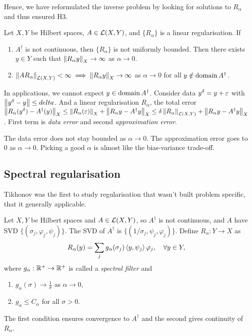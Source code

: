 \documentclass[12pt]{article}
\begin{document}
Hence, we have reformulated the inverse problem by looking for solutions to $R_\alpha$ and thus ensured H3.

\begin{theorem}
    Let $X,Y$ be Hilbert spaces, $A\in \mathcal{L}(X,Y)$, and $\{R_\alpha\}$ is a linear regularisation. If 
    \begin{enumerate}[label=(\alph*)]
        \item $A^\dagger $ is not continuous, then $\{ R_{\alpha} \}$ is not uniformly bounded. Then there exists $y\in Y$ such that $\left\lVert R_{\alpha} y\right\rVert_X \to \infty$ as $\alpha \to 0$. 
        \item $\left\lVert AR_\alpha\right\rVert_{\mathcal{L}(X,Y)} < \infty \implies \left\lVert R_\alpha y\right\rVert_X \to \infty$ as $\alpha \to 0$ for all $y \notin \operatorname{domain} A^\dagger $. 
    \end{enumerate}
\end{theorem}

In applications, we cannot expect $y\in \operatorname{domain} A^\dagger $. Consider data $y^\delta = y+ \varepsilon$ with  $\left\lVert y^\delta - y\right\rVert\leq delta$. And a linear regularisation $R_\alpha$, the total error $\left\lVert R_\alpha(y^\delta)-A^\dagger (y)\right\rVert_X \leq \left\lVert R_\alpha(\varepsilon)\right\rVert_X + \left\lVert R_\alpha y - A^\dagger  y\right\rVert_X \leq \delta \left\lVert R_\alpha\right\rVert_{\mathcal{L}(X,Y)} + \left\lVert R_\alpha y - A^\dagger  y\right\rVert_X$. First term is \textit{data error} and second \textit{approximation error}.

The data error does not stay bounded as $\alpha \to 0$. The approximation error goes to 0 as $\alpha\to 0$. Picking a good $\alpha$ is almost like the bias-variance trade-off.

\subsection{Spectral regularisation}
Tikhonov was the first to study regularisation that wasn't built problem specific, that it generally applicable. 

\begin{definition}
    Let $X,Y$ be Hilbert spaces and $A\in \mathcal{L}(X,Y)$, so $A^\dagger $ is not continuous, and $A$ have SVD $\{(\sigma_j,\varphi_j, \psi_j)\}$. The SVD of $A^\dagger $ is $\{(1/\sigma_j,\psi_j, \varphi_j)\}$. Define $R_\alpha:Y\to X$ as 
    \begin{equation*}
        R_\alpha(y) = \sum_j g_\alpha(\sigma_j)\left\langle y, \psi_j\right\rangle\varphi_j, \quad \forall y\in Y,
    \end{equation*} 
    where $g_\alpha:\mathbb{R}^{+} \to \mathbb{R}^+$ is called a \textit{spectral filter} and 
    \begin{enumerate}[label=(\alph*)]
        \item $g_\alpha(\sigma)\to \frac{1}{\sigma}$ as $\alpha\to 0$,
        \item $g_\alpha \leq C_\alpha$ for all $\sigma >0$.
    \end{enumerate}
    The first condition ensures convergence to $A^\dagger $ and the second gives continuity of $R_\alpha$.
\end{definition}
\end{document}
